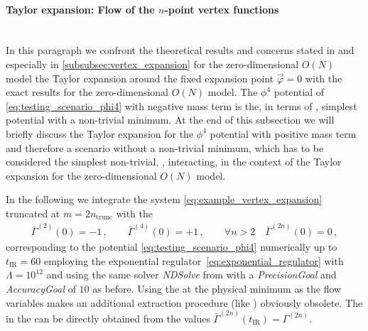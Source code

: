 \FloatBarrier
\paragraph{\frg{} Taylor expansion: Flow of the $n$-point vertex functions}\label{paragraph:sc2taylorFlow}\mbox{}\\
In this paragraph we confront the theoretical results and concerns stated in \teRef{} and especially in \cref{subsubsec:vertex_expansion} for the zero-dimensional $O(N)$ model \wrt{} the Taylor expansion around the fixed expansion point $\vec{\varphi} = 0$ with the exact results for the zero-dimensional $O(N)$ model.
The $\phi^4$ potential of \cref{eq:testing_scenario_phi4} with negative mass term is the, in terms of \ics{}, simplest \uv{} potential with a non-trivial minimum.
At the end of this subsection we will briefly discuss the Taylor expansion for the $\phi^4$ potential with positive mass term and therefore a scenario without a non-trivial minimum, which has to be considered the simplest non-trivial, \ie{}, interacting, \uv{} \ic{} in the context of the Taylor expansion for the zero-dimensional $O(N)$ model.

In the following we integrate the \ode{} system \eqref{eq:example_vertex_expansion} truncated at $m = 2 n_\mathrm{trunc}$ with the \ic{}
\begin{align}
	\bar{\Gamma}^{(2)} ( 0 ) = - 1 \, ,\qquad \bar{\Gamma}^{(4)} ( 0 ) = + 1 \, ,\qquad \forall n > 2 \quad \bar{\Gamma}^{(2n)} ( 0 ) = 0 \, ,
\end{align}
corresponding to the potential \eqref{eq:testing_scenario_phi4} numerically up to $t_\mathrm{IR}=60$ employing the exponential regulator~\eqref{eq:exponential_regulator} with $\Lambda=10^{12}$ and using the same \ode{} solver \textit{NDSolve} from \WAMXIIwR{} with a \textit{PrecisionGoal} and \textit{AccuracyGoal} of $10$ as before.
Using the \nptFunctions{} at the physical minimum as the flow variables makes an additional extraction procedure (like ) obviously obsolete.
The \nptFunctions{} in the \ir{} can be directly obtained from the values $\bar{\Gamma}^{(2n)} ( t_\mathrm{IR} ) = \Gamma^{(2n)}$.

